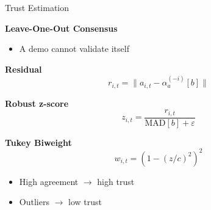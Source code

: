 \begin{frame}{Trust Estimation}

    \textbf{Leave-One-Out Consensus}
    \begin{itemize}
        \item A demo cannot validate itself
    \end{itemize}

    \vspace{0.7em}

    \textbf{Residual}
    \[
        r_{i,t} = \|a_{i,t} - \alpha_a^{(-i)}[b]\|
    \]

    \vspace{0.7em}

    \textbf{Robust z-score}
    \[
        z_{i,t}
        =
        \frac{r_{i,t}}
        {\mathrm{MAD}[b]+\varepsilon}
    \]

    \vspace{0.7em}

    \textbf{Tukey Biweight}
    \[
        w_{i,t}
        =
        {\left(1-{(z/c)}^2\right)}^2
    \]

    \vspace{0.7em}

    \begin{itemize}
        \item High agreement $\rightarrow$ high trust
        \item Outliers $\rightarrow$ low trust
    \end{itemize}

\end{frame}

